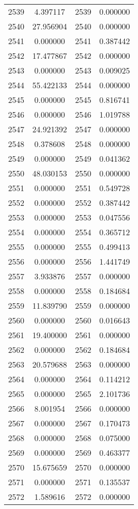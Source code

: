 \documentclass[12pt]{article}
\begin{document}
\begin{longtable}{@{}cccc@{}}
2539 & 4.397117 & 2539 & 0.000000 \\
2540 & 27.956904 & 2540 & 0.000000 \\
2541 & 0.000000 & 2541 & 0.387442 \\
2542 & 17.477867 & 2542 & 0.000000 \\
2543 & 0.000000 & 2543 & 0.009025 \\
2544 & 55.422133 & 2544 & 0.000000 \\
2545 & 0.000000 & 2545 & 0.816741 \\
2546 & 0.000000 & 2546 & 1.019788 \\
2547 & 24.921392 & 2547 & 0.000000 \\
2548 & 0.378608 & 2548 & 0.000000 \\
2549 & 0.000000 & 2549 & 0.041362 \\
2550 & 48.030153 & 2550 & 0.000000 \\
2551 & 0.000000 & 2551 & 0.549728 \\
2552 & 0.000000 & 2552 & 0.387442 \\
2553 & 0.000000 & 2553 & 0.047556 \\
2554 & 0.000000 & 2554 & 0.365712 \\
2555 & 0.000000 & 2555 & 0.499413 \\
2556 & 0.000000 & 2556 & 1.441749 \\
2557 & 3.933876 & 2557 & 0.000000 \\
2558 & 0.000000 & 2558 & 0.184684 \\
2559 & 11.839790 & 2559 & 0.000000 \\
2560 & 0.000000 & 2560 & 0.016643 \\
2561 & 19.400000 & 2561 & 0.000000 \\
2562 & 0.000000 & 2562 & 0.184684 \\
2563 & 20.579688 & 2563 & 0.000000 \\
2564 & 0.000000 & 2564 & 0.114212 \\
2565 & 0.000000 & 2565 & 2.101736 \\
2566 & 8.001954 & 2566 & 0.000000 \\
2567 & 0.000000 & 2567 & 0.170473 \\
2568 & 0.000000 & 2568 & 0.075000 \\
2569 & 0.000000 & 2569 & 0.463377 \\
2570 & 15.675659 & 2570 & 0.000000 \\
2571 & 0.000000 & 2571 & 0.135537 \\
2572 & 1.589616 & 2572 & 0.000000 \\

\end{longtable}
\end{document}
